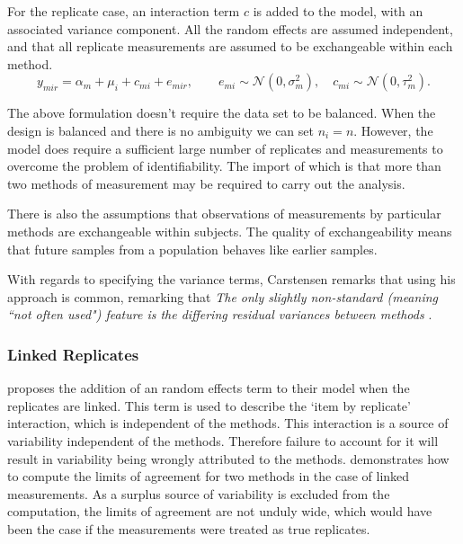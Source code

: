 \documentclass[12pt, a4paper]{report}
\theoremstyle{plain}
\theoremstyle{definition}
\theoremstyle{remark}
\begin{document}
For the replicate case, an interaction term $c$ is added to the model, with an associated variance component. All the random effects are assumed independent, and that all replicate measurements are assumed to be exchangeable within each method.
\begin{equation}
y_{mir}  = \alpha_{m} + \mu_{i} + c_{mi} + e_{mir}, \qquad  e_{mi}
\sim \mathcal{N}(0,\sigma^{2}_{m}), \quad c_{mi} \sim \mathcal{N}(0,\tau^{2}_{m}).
\end{equation}
 





The above formulation doesn't require the data set to be balanced. When the design is balanced and there is no ambiguity we can set $n_i=n$. However, the model does require a sufficient large number of replicates and measurements to overcome the problem of identifiability. The import of which is that more than two methods of measurement may be required to carry out the analysis. 

There is also the assumptions that observations of measurements by particular methods are exchangeable within subjects. The quality of exchangeability means that future samples from a population behaves like earlier samples.



With regards to specifying the variance terms, Carstensen remarks that using his approach is common, remarking that \emph{The only slightly non-standard (meaning ``not often used") feature is the differing residual variances between methods }\citep{BXC2010}.

\subsubsection*{Linked Replicates}


\citet{BXC2008} proposes the addition of an random effects term to their model when the replicates are linked. This term is used to describe the `item by replicate' interaction, which is independent of the methods. This interaction is a source of variability independent of the methods. Therefore failure to account for it will result in variability being wrongly attributed to the methods. \citet{BXC2008} demonstrates how to compute the limits of agreement for two methods in the case of linked measurements. As a surplus source of variability is excluded from the computation, the limits of agreement are not unduly wide, which would have been the case if the measurements were treated as true replicates.
\end{document}
